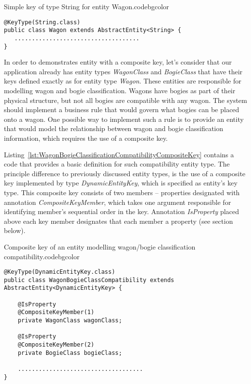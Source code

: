   \begin{code}{Simple key of type String for entity Wagon.}{\label{lst:WagonSimpleKey}}{codebgcolor}
    \begin{lstlisting}
@KeyType(String.class)
public class Wagon extends AbstractEntity<String> {
   ....................................
}
    \end{lstlisting}
  \end{code}

  In order to demonstrates entity with a composite key, let's consider that our application already has entity types \emph{WagonClass} and \emph{BogieClass} that have their keys defined exactly as for entity type \emph{Wagon}.
  These entities are responsible for modelling wagon and bogie classification.
  Wagons have bogies as part of their physical structure, but not all bogies are compatible with any wagon.
  The system should implement a business rule that would govern what bogies can be placed onto a wagon. 
  One possible way to implement such a rule is to provide an entity that would model the relationship between wagon and bogie classification information, which requires the use of a composite key.
  
  Listing~\ref{lst:WagonBogieClassificationCompatibilityCompositeKey} contains a code that provides a basic definition for such compatibility entity type.
  The principle difference to previously discussed entity types, is the use of a composite key implemented by type \emph{DynamicEntityKey}, which is specified as entity's key type.
  This composite key consists of two members -- properties designated with annotation \emph{CompositeKeyMember}, which takes one argument responsible for identifying member's sequential order in the key.
  Annotation \emph{IsProperty} placed above each key member designates that each member a property (see section below).


  \begin{code}{Composite key of an entity modelling wagon/bogie classification compatibility.}{\label{lst:WagonBogieClassificationCompatibilityCompositeKey}}{codebgcolor}
    \begin{lstlisting}
@KeyType(DynamicEntityKey.class)
public class WagonBogieClassCompatibility extends AbstractEntity<DynamicEntityKey> {

    @IsProperty
    @CompositeKeyMember(1)
    private WagonClass wagonClass;

    @IsProperty
    @CompositeKeyMember(2)
    private BogieClass bogieClass;

    ....................................
}
    \end{lstlisting}
  \end{code}

